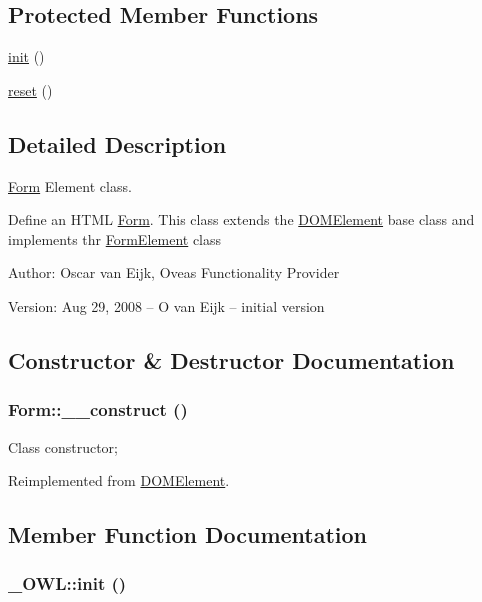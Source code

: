 \subsection*{Protected Member Functions}
\begin{CompactItemize}
\item 
\hyperlink{class__OWL_e0ef3ded56e8a6b34b6461e5a721cd3e}{init} ()
\item 
\hyperlink{class__OWL_2f2a042bcf31965194c03033df0edc9b}{reset} ()
\end{CompactItemize}


\subsection{Detailed Description}
\hyperlink{classForm}{Form} Element class. 

Define an HTML \hyperlink{classForm}{Form}. This class extends the \hyperlink{classDOMElement}{DOMElement} base class and implements thr \hyperlink{classFormElement}{FormElement} class \begin{Desc}
\item[Author:]Oscar van Eijk, Oveas Functionality Provider \end{Desc}
\begin{Desc}
\item[Version:]Aug 29, 2008 -- O van Eijk -- initial version \end{Desc}


\subsection{Constructor \& Destructor Documentation}
\hypertarget{classForm_47e154733dffd6b61a74f4d2f6498f8c}{
\subsubsection{\setlength{\rightskip}{0pt plus 5cm}Form::\_\-\_\-construct ()}}
\label{classForm_47e154733dffd6b61a74f4d2f6498f8c}


Class constructor; 

Reimplemented from \hyperlink{classDOMElement_309ad8e22a59ba874187929c4c851be3}{DOMElement}.

\subsection{Member Function Documentation}
\hypertarget{class__OWL_e0ef3ded56e8a6b34b6461e5a721cd3e}{
\subsubsection{\setlength{\rightskip}{0pt plus 5cm}\_\-OWL::init ()}}
\label{class__OWL_e0ef3ded56e8a6b34b6461e5a721cd3e}


